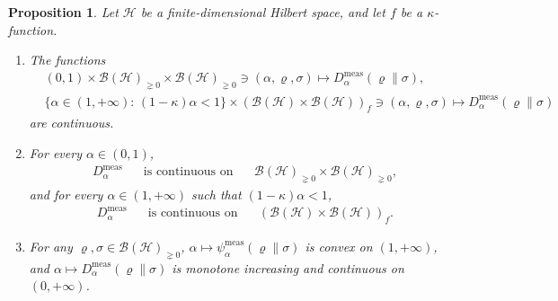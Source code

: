 \documentclass[unsortedaddress,superscriptaddress,pra,notitlepage]{revtex4}
\newtheorem{prop}[definition]{Proposition}
\def\B{{\mathcal B}}
\def\rho{\varrho}
\def\hil{{\mathcal H}}
\def\bz{\left(}
\def\jz{\right)}
\def\meas{\mathrm{meas}}
\def\pne{_{\gneq 0}}
\def\pwr{\kappa}
\newcommand{\ds}{\mbox{ }\mbox{ }}
\begin{document}
\begin{prop}\label{prop:meas cont}
Let $\hil$ be a finite-dimensional Hilbert space, and let 
$f$ be a $\pwr$-function.
\begin{enumerate}
\item\label{measured cont1}
The functions 
\begin{align}
&(0,1)\times\B(\hil)\pne\times\B(\hil)\pne\ni(\alpha,\rho,\sigma)\mapsto
D_{\alpha}^{\meas}(\rho\|\sigma),\label{meas jointcont}\\
&\{\alpha\in(1,+\infty):\,(1-\pwr)\alpha<1\}\times\bz\B(\hil)\times\B(\hil)\jz_{f}\ni(\alpha,\rho,\sigma)\mapsto
D_{\alpha}^{\meas}(\rho\|\sigma)\label{meas jointcont2}
\end{align}
are continuous.
\item\label{measured cont2}
For every $\alpha\in(0,1)$,
\begin{align}\label{meas cont1}
D_{\alpha}^{\meas} \ds\text{ is continuous on  }\ds\B(\hil)\pne\times\B(\hil)\pne,
\end{align}
and for every $\alpha\in(1,+\infty)$ such that $(1-\pwr)\alpha<1$,
\begin{align}\label{meas cont}
D_{\alpha}^{\meas} \ds\text{ is continuous on  }\ds
\bz\B(\hil)\times\B(\hil)\jz_{f}.
\end{align}
\item\label{measured cont3}
For any $\rho,\sigma\in \B(\hil)\pne$,
$\alpha\mapsto\psi_{\alpha}^{\meas}(\rho\|\sigma)$ is convex on $(1,+\infty)$, and 
$\alpha\mapsto D_{\alpha}^{\meas}(\rho\|\sigma)$ is monotone increasing and continuous
 on $(0,+\infty)$.
\end{enumerate}
\end{prop}
\end{document}
